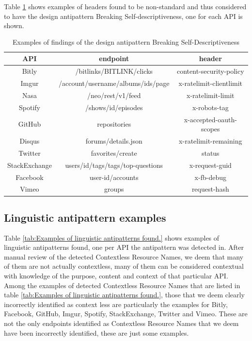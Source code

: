 Table \ref{tab:Examples of findings of the design antipattern Breaking Self-Descriptiveness} shows examples of headers found to be non-standard and thus considered to have the design antipattern Breaking Self-descriptiveness, one for each API is shown.

\begin{table}[htb!]
    \centering
    \begin{tabular}{|c|c|c|}
    \hline
     API & endpoint & header \\ \hline
     Bitly & /bitlinks/{BITLINK}/clicks & content-security-policy \\ \hline
     Imgur & /account/{username}/albums/ids/{page} & x-ratelimit-clientlimit \\ \hline
     Nasa & /neo/rest/v1/feed & x-ratelimit-limit \\ \hline
     Spotify & /shows/{id}/episodes & x-robots-tag \\ \hline
     GitHub & repositories & x-accepted-oauth-scopes \\ \hline
     Disqus & forums/details.json & x-ratelimit-remaining \\ \hline
     Twitter & favorites/create & status \\ \hline
     StackExchange & users/{id}/tags/{tags}/top-questions & x-request-guid \\ \hline
     Facebook & {user-id}/accounts & x-fb-debug \\ \hline
     Vimeo & groups & request-hash \\ \hline
    \end{tabular}
    \caption{Examples of findings of the design antipattern Breaking Self-Descriptiveness}
    \label{tab:Examples of findings of the design antipattern Breaking Self-Descriptiveness}
\end{table}

\subsection{Linguistic antipattern examples}

Table \ref{tab:Examples of linguistic antipatterns found.} shows examples of linguistic antipatterns found, one per API the antipattern was detected in. After manual review of the detected Contextless Resource Names, we deem that many of them are not actually contextless, many of them can be considered contextual with knowledge of the purpose, content and context of that particular API. Among the examples of detected Contextless Resource Names that are listed in table \ref{tab:Examples of linguistic antipatterns found.}, those that we deem clearly incorrectly identified as context less are particularly the examples for Bitly, Facebook, GitHub, Imgur, Spotify, StackExchange, Twitter and Vimeo. These are not the only endpoints identified as Contextless Resource Names that we deem have been incorrectly identified, these are just some examples.

